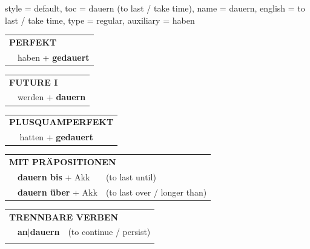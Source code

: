 \begin{verbentry}{
  style = {default},
  toc = {dauern (to last / take time)},
  name = {dauern},
  english = {to last / take time},
  type = {regular},
  auxiliary = {haben}
}
    \vspace{10pt}

 \begin{tabular}{rl}
     \multicolumn{2}{l}{\textbf{PERFEKT}}\\
   & haben + \textbf{gedauert}\\
  \end{tabular}
\hfill
   \begin{tabular}{rl}
    \multicolumn{2}{l}{\textbf{FUTURE I} }\\
   & werden + \textbf{dauern}\\
  \end{tabular}
\hfill
   \begin{tabular}{rl}
      \multicolumn{2}{l}{\textbf{PLUSQUAMPERFEKT}}\\
   & hatten + \textbf{gedauert}\\
  \end{tabular}

   \vspace{10pt}

   \begin{tabular}{lll}
      \multicolumn{3}{l}{\textbf{MIT PRÄPOSITIONEN}}\\
& \textbf{dauern bis} + Akk & (to last until)\\
& \textbf{dauern über} + Akk & (to last over / longer than)\\
   \end{tabular}
  \hfill
   \begin{tabular}{lll}
      \multicolumn{3}{l}{\textbf{TRENNBARE VERBEN}}\\
 & \textbf{an$|$dauern} & (to continue / persist)\\
\vspace{10pt}
  \end{tabular}

\vspace{-5pt}
\end{verbentry}

